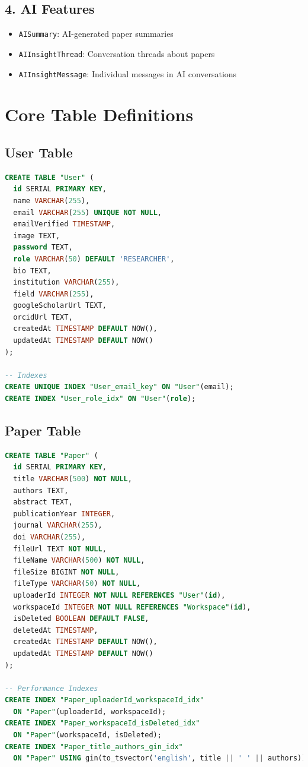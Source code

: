 \subsection{4. AI Features}
\begin{itemize}[leftmargin=*,topsep=3pt,itemsep=2pt]
    \item \texttt{AISummary}: AI-generated paper summaries
    \item \texttt{AIInsightThread}: Conversation threads about papers
    \item \texttt{AIInsightMessage}: Individual messages in AI conversations
\end{itemize}

\section{Core Table Definitions}
\label{sec:schema-tables}

\subsection{User Table}
\begin{lstlisting}[language=SQL, caption={User Table Schema}]
CREATE TABLE "User" (
  id SERIAL PRIMARY KEY,
  name VARCHAR(255),
  email VARCHAR(255) UNIQUE NOT NULL,
  emailVerified TIMESTAMP,
  image TEXT,
  password TEXT,
  role VARCHAR(50) DEFAULT 'RESEARCHER',
  bio TEXT,
  institution VARCHAR(255),
  field VARCHAR(255),
  googleScholarUrl TEXT,
  orcidUrl TEXT,
  createdAt TIMESTAMP DEFAULT NOW(),
  updatedAt TIMESTAMP DEFAULT NOW()
);

-- Indexes
CREATE UNIQUE INDEX "User_email_key" ON "User"(email);
CREATE INDEX "User_role_idx" ON "User"(role);
\end{lstlisting}

\subsection{Paper Table}
\begin{lstlisting}[language=SQL, caption={Paper Table Schema}]
CREATE TABLE "Paper" (
  id SERIAL PRIMARY KEY,
  title VARCHAR(500) NOT NULL,
  authors TEXT,
  abstract TEXT,
  publicationYear INTEGER,
  journal VARCHAR(255),
  doi VARCHAR(255),
  fileUrl TEXT NOT NULL,
  fileName VARCHAR(500) NOT NULL,
  fileSize BIGINT NOT NULL,
  fileType VARCHAR(50) NOT NULL,
  uploaderId INTEGER NOT NULL REFERENCES "User"(id),
  workspaceId INTEGER NOT NULL REFERENCES "Workspace"(id),
  isDeleted BOOLEAN DEFAULT FALSE,
  deletedAt TIMESTAMP,
  createdAt TIMESTAMP DEFAULT NOW(),
  updatedAt TIMESTAMP DEFAULT NOW()
);

-- Performance Indexes
CREATE INDEX "Paper_uploaderId_workspaceId_idx" 
  ON "Paper"(uploaderId, workspaceId);
CREATE INDEX "Paper_workspaceId_isDeleted_idx" 
  ON "Paper"(workspaceId, isDeleted);
CREATE INDEX "Paper_title_authors_gin_idx" 
  ON "Paper" USING gin(to_tsvector('english', title || ' ' || authors));
\end{lstlisting}


